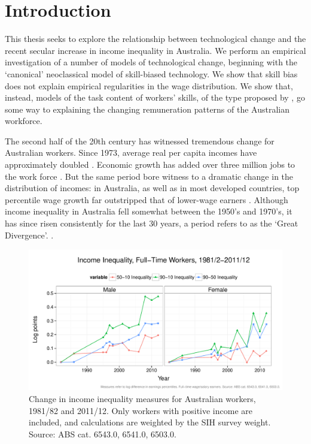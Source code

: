 \chapter{Introduction}

This thesis seeks to explore the relationship between technological change and the recent secular increase in income inequality in Australia. We perform an empirical investigation of a number of models of technological change, beginning with the `canonical' neoclassical model of skill-biased technology. We show that skill bias does not explain empirical regularities in the wage distribution. We show that, instead, models of the task content of workers' skills, of the type proposed by \citet{Levy2003}, go some way to explaining the changing remuneration patterns of the Australian workforce.

The second half of the 20th century has witnessed tremendous change for Australian workers. Since 1973, average real per capita incomes have approximately doubled \citep{NA20124}. Economic growth has added over three million jobs to the work force \citep{LFSApr2013}. But the same period bore witness to a dramatic change in the distribution of incomes: in Australia, as well as in most developed countries, top percentile wage growth far outstripped that of lower-wage earners \citep{Atkinson1997,Borland1999,Leigh2013}. Although income inequality in Australia fell somewhat between the 1950's and 1970's, it has since risen consistently for the last 30 years, a period \citet{Leigh2013} refers to as the `Great Divergence'. \citep{Leigh2005,Gaston2009}. 

\begin{figure}[h]
  \centering
  \includegraphics[width=\textwidth]{../figure/ineq_time.pdf}
  \caption{Change in income inequality measures for Australian workers, 1981/82 and 2011/12. Only workers with positive income are included, and calculations are weighted by the SIH survey weight. Source: ABS cat. 6543.0, 6541.0, 6503.0.}
\end{figure}

